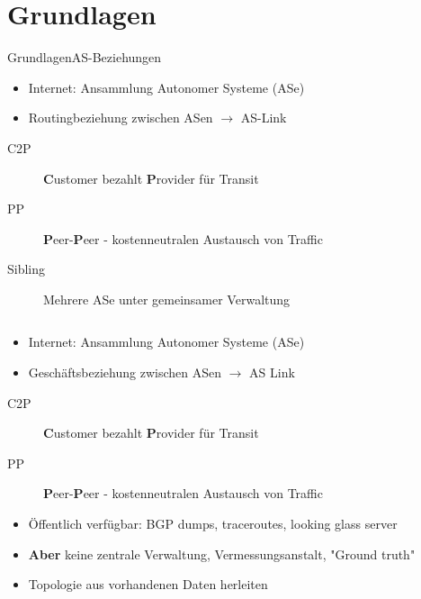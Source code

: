 \documentclass[ngerman,compress,hyperref={bookmarks}]{beamer}
\begin{document}
\section{Grundlagen}
\begin{frame}[allowframebreaks]{Grundlagen}{AS-Beziehungen}
  \begin{itemize}
    \item Internet: Ansammlung Autonomer Systeme (ASe)
    \item Routingbeziehung zwischen ASen $\rightarrow$ AS-Link
  \end{itemize}
  \begin{description}
    \item[C2P] \textbf{C}ustomer bezahlt \textbf{P}rovider für Transit
    \item[PP] \textbf{P}eer-\textbf{P}eer - kostenneutralen Austausch von Traffic
    \item[Sibling] Mehrere ASe unter gemeinsamer Verwaltung
  \end{description}



\framebreak
  \begin{columns}[c]
    \begin{column}{0.75\textwidth}
      \begin{itemize}
        \item Internet: Ansammlung Autonomer Systeme (ASe)
        \item Geschäftsbeziehung zwischen ASen $\rightarrow$ AS Link
      \end{itemize}
      \begin{description}
        \item[C2P] \textbf{C}ustomer bezahlt \textbf{P}rovider für Transit
        \item[PP] \textbf{P}eer-\textbf{P}eer - kostenneutralen Austausch von Traffic
      \end{description}
      \begin{itemize}
        \item Öffentlich verfügbar: BGP dumps, traceroutes, looking glass server
        \item \textbf{Aber} keine zentrale Verwaltung, Vermessungsanstalt, "Ground truth"
        \item Topologie aus vorhandenen Daten herleiten
      \end{itemize}
    \end{column}
  \end{columns}
\end{frame}
\end{document}
